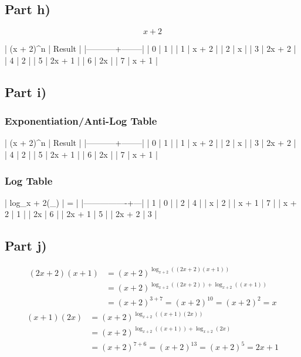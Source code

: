 \documentclass[10pt,a4paper]{article}
\begin{document}
\subsection*{Part h)}

\begin{equation*}
  x + 2
\end{equation*}

| (x + 2)^n | Result |
|-----------+--------|
|         0 | 1      |
|         1 | x + 2  |
|         2 | x      |
|         3 | 2x + 2 |
|         4 | 2      |
|         5 | 2x + 1 |
|         6 | 2x     |
|         7 | x + 1  |

\subsection*{Part i)}

\subsubsection*{Exponentiation/Anti-Log Table}

| (x + 2)^n | Result |
|-----------+--------|
|         0 | 1      |
|         1 | x + 2  |
|         2 | x      |
|         3 | 2x + 2 |
|         4 | 2      |
|         5 | 2x + 1 |
|         6 | 2x     |
|         7 | x + 1  |

\subsubsection*{Log Table}

| log_{x + 2}(_) | = |
|----------------+---|
| 1              | 0 |
| 2              | 4 |
| x              | 2 |
| x + 1          | 7 |
| x + 2          | 1 |
| 2x             | 6 |
| 2x + 1         | 5 |
| 2x + 2         | 3 |

\subsection*{Part j)}

\begin{align*}
  (2x + 2)(x + 1) & = (x + 2)^{\log_{x + 2}((2x + 2)(x + 1))}\\
                  & = (x + 2)^{\log_{x + 2}((2x + 2)) + \log_{x + 2}((x + 1))}\\
                  & = (x + 2)^{3 + 7} = (x + 2)^{10} = (x + 2)^{2} = x
\end{align*}
\begin{align*}
  (x + 1)(2x) & = (x + 2)^{\log_{x + 2}((x + 1)(2x))}\\
              & = (x + 2)^{\log_{x + 2}((x + 1)) + \log_{x + 2}(2x)}\\
              & = (x + 2)^{7 + 6} = (x + 2)^{13} = (x + 2)^{5} = 2x + 1
\end{align*}
\end{document}
